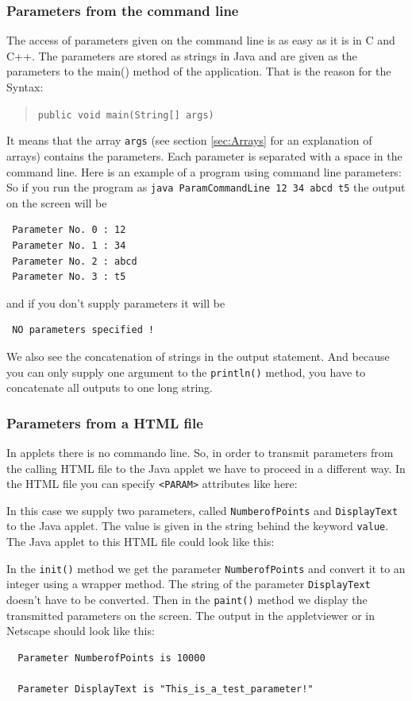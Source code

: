 \subsubsection{Parameters from the command line}
The access of parameters given on the command line is as easy as it
is in C and C++. The parameters are stored as strings in Java and
are given as the parameters to the main() method of the application.
That is the reason for the Syntax:
\begin{quotation}
  \verb|public void main(String[] args) |
\end{quotation}
It means that the array \verb|args| (see section \ref{sec:Arrays}
for an explanation of arrays) contains the parameters. Each parameter
is separated with a space in the command line. Here is an example of a 
program using command line parameters:
So if you run the program as \verb|java ParamCommandLine 12 34 abcd t5|
the output on the screen will be
\begin{verbatim}
 Parameter No. 0 : 12
 Parameter No. 1 : 34
 Parameter No. 2 : abcd
 Parameter No. 3 : t5
\end{verbatim}
and if you don't supply parameters it will be
\begin{verbatim}
 NO parameters specified !
\end{verbatim}
We also see the concatenation of strings in the output statement.
And because you can only supply one argument to the  \verb|println()|
method, you have to concatenate all outputs to one long string.

\subsubsection{Parameters from a HTML file}
In applets there is no commando line. So, in order to transmit 
parameters from the calling HTML file to the Java applet we have to
proceed in a different way.
In the HTML file you can
specify \verb|<PARAM>| attributes like here:

In this case we supply two parameters, called \verb|NumberofPoints| and
\verb|DisplayText| to the Java applet. The value is given in the string
behind the keyword \verb|value|. The Java applet to this HTML file
could look like this:

In the \verb|init()| method we get the parameter \verb|NumberofPoints|
and convert it to an integer using a wrapper method. The string 
of the parameter \verb|DisplayText| doesn't have
to be converted. Then in the \verb|paint()| method we display
the transmitted parameters on the screen. The output in the 
appletviewer or in Netscape should look like this:
\begin{verbatim}
  Parameter NumberofPoints is 10000

  Parameter DisplayText is "This_is_a_test_parameter!"
\end{verbatim}

